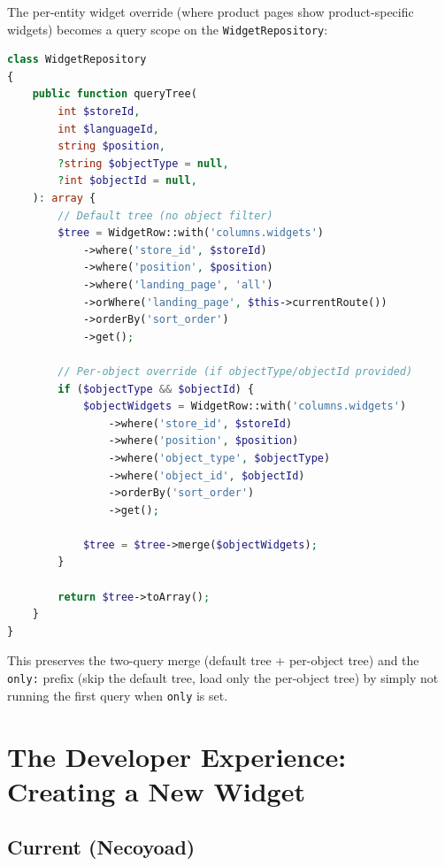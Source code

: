\documentclass[11pt,a4paper]{article}
\begin{document}
\begin{keybox}
The per-entity widget override (where product pages show
product-specific widgets) becomes a query scope on the
\texttt{WidgetRepository}:

\begin{lstlisting}[language=PHP,basicstyle=\ttfamily\small,numbers=none,frame=none]
class WidgetRepository
{
    public function queryTree(
        int $storeId,
        int $languageId,
        string $position,
        ?string $objectType = null,
        ?int $objectId = null,
    ): array {
        // Default tree (no object filter)
        $tree = WidgetRow::with('columns.widgets')
            ->where('store_id', $storeId)
            ->where('position', $position)
            ->where('landing_page', 'all')
            ->orWhere('landing_page', $this->currentRoute())
            ->orderBy('sort_order')
            ->get();

        // Per-object override (if objectType/objectId provided)
        if ($objectType && $objectId) {
            $objectWidgets = WidgetRow::with('columns.widgets')
                ->where('store_id', $storeId)
                ->where('position', $position)
                ->where('object_type', $objectType)
                ->where('object_id', $objectId)
                ->orderBy('sort_order')
                ->get();

            $tree = $tree->merge($objectWidgets);
        }

        return $tree->toArray();
    }
}
\end{lstlisting}

This preserves the two-query merge (default tree + per-object tree)
and the \texttt{only:} prefix (skip the default tree, load only the
per-object tree) by simply not running the first query when
\texttt{only} is set.
\end{keybox}

\section{The Developer Experience: Creating a New Widget}\label{sec:dev-experience}

\subsection{Current (Necoyoad)}
\end{document}
